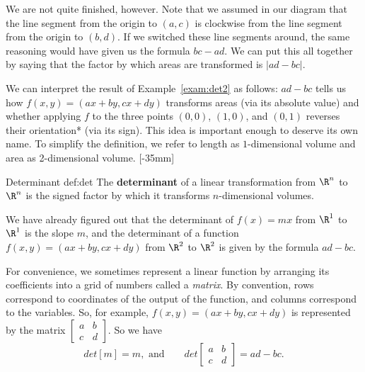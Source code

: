 \documentclass[indent]{watsonbook}
\begin{document}
{\begin{solution}
  We are not quite finished, however. Note that we assumed in our
  diagram that the line segment from the origin to $(a,c)$ is
  clockwise from the line segment from the origin to $(b,d)$. If we
  switched these line segments around, the same reasoning would have
  given us the formula $bc - ad$. We can put this all together by saying
  that the factor by which areas are transformed is $\boxed{|ad - bc|}$.
\end{solution}

We can interpret the result of Example~\ref{exam:det2} as follows:
$ad - bc$ tells us how $f(x,y) = (ax + by, cx + dy)$ transforms areas
(via its absolute value) and whether applying $f$ to the three points
$(0,0)$, $(1,0)$, and $(0,1)$ reverses their orientation* (via its
sign). This idea is important enough to deserve its own name. To
simplify the definition, we refer to length as $1$-dimensional volume
and area as 2-dimensional volume. [-35mm]

\begin{defn}{Determinant }{def:det} \bang{-5mm}
  The \textbf{determinant} of a linear transformation from $\R^n$ to
  $\R^n$ is the signed factor by which it transforms $n$-dimensional
  volumes.
\end{defn}

We have already figured out that the determinant of $f(x) = mx$ from
$\R^1$ to $\R^1$ is the slope $m$, and the determinant of a function
$f(x,y) = (ax + by, cx + dy)$ from $\R^2$ to $\R^2$ is given by the
formula $ad - bc$.

For convenience, we sometimes represent a linear function by arranging
its coefficients into a grid of numbers called a \textit{matrix}. By
convention, rows correspond to coordinates of the output of the
function, and columns correspond to the variables. So, for example,
$f(x,y) = (ax + by, cx + dy)$ is represented by the matrix
$\left[\begin{array}{cc} a & b \\ c & d \end{array}\right]$. So we
have
\[
  {d}et [m] = m, \text{ and} \qquad {d}et \left[\begin{array}{cc} a & b \\ c & d \end{array}\right] = ad - bc.
\]

}
\end{document}
